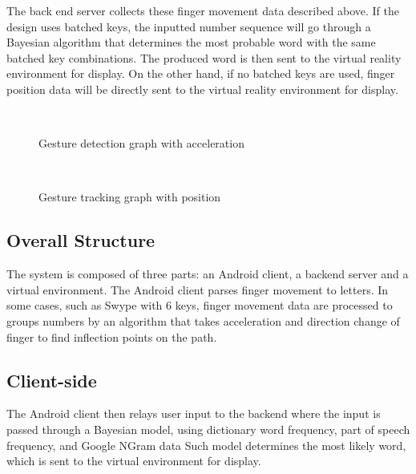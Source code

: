 The back end server collects these finger movement data described above.
If the design uses batched keys, the inputted number sequence will go through a Bayesian algorithm that determines the most probable word with the same batched key combinations. The produced word is then sent to the virtual reality environment for display.
On the other hand, if no batched keys are used, finger position data will be directly sent to the virtual reality environment for display.



\begin{figure}
  \centering


	\caption{Gesture detection graph with acceleration}~\label{fig:acceleration}
\end{figure}

\begin{figure}
\centering

  
  \caption{Gesture tracking graph with position}~\label{fig:position}
\end{figure}



\subsection{Overall Structure}
The system is composed of three parts: an Android client, a backend server and a virtual environment. The Android client parses finger movement to letters. In some cases, such as Swype with 6 keys, finger movement data are processed to groups numbers by an algorithm that takes acceleration and direction change of finger to find inflection points on the path.

\subsection{Client-side}
The Android client then relays user input to the backend where the input is passed through a Bayesian model, using dictionary word frequency, part of speech frequency, and Google NGram data Such model determines the most likely word, which is sent to the virtual environment for display.

